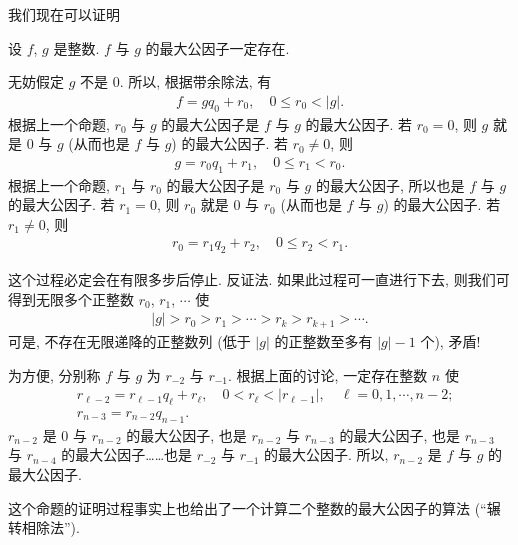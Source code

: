 我们现在可以证明
\begin{proposition}
    设 $f$, $g$ 是整数. $f$ 与 $g$ 的最大公因子一定存在.
\end{proposition}

\begin{pf}
    无妨假定 $g$ 不是 $0$. 所以, 根据带余除法, 有
    \begin{align*}
        f = gq_0 + r_0, \quad 0 \leq r_0 < |g|.
    \end{align*}
    根据上一个命题, $r_0$ 与 $g$ 的最大公因子是 $f$ 与 $g$ 的最大公因子. 若 $r_0 = 0$, 则 $g$ 就是 $0$ 与 $g$ (从而也是 $f$ 与 $g$) 的最大公因子. 若 $r_0 \neq 0$, 则
    \begin{align*}
        g = r_0 q_1 + r_1, \quad 0 \leq r_1 < r_0.
    \end{align*}
    根据上一个命题, $r_1$ 与 $r_0$ 的最大公因子是 $r_0$ 与 $g$ 的最大公因子, 所以也是 $f$ 与 $g$ 的最大公因子. 若 $r_1 = 0$, 则 $r_0$ 就是 $0$ 与 $r_0$ (从而也是 $f$ 与 $g$) 的最大公因子. 若 $r_1 \neq 0$, 则
    \begin{align*}
        r_0 = r_1 q_2 + r_2, \quad 0 \leq r_2 < r_1.
    \end{align*}

    这个过程必定会在有限多步后停止. 反证法. 如果此过程可一直进行下去, 则我们可得到无限多个正整数 $r_0$, $r_1$, $\cdots$ 使
    \begin{align*}
        |g| > r_0 > r_1 > \cdots > r_k > r_{k+1} > \cdots.
    \end{align*}
    可是, 不存在无限递降的正整数列 (低于 $|g|$ 的正整数至多有 $|g| - 1$ 个), 矛盾!

    为方便, 分别称 $f$ 与 $g$ 为 $r_{-2}$ 与 $r_{-1}$. 根据上面的讨论, 一定存在整数 $n$ 使
    \begin{align*}
         & r_{\ell - 2} = r_{\ell - 1} q_{\ell} + r_{\ell}, \quad 0 < r_{\ell} < |r_{\ell - 1}|, \quad \ell = 0,1,\cdots,n-2; \\
         & r_{n - 3} = r_{n - 2} q_{n - 1}.
    \end{align*}
    $r_{n-2}$ 是 $0$ 与 $r_{n-2}$ 的最大公因子, 也是 $r_{n-2}$ 与 $r_{n-3}$ 的最大公因子, 也是 $r_{n-3}$ 与 $r_{n-4}$ 的最大公因子……也是 $r_{-2}$ 与 $r_{-1}$ 的最大公因子. 所以, $r_{n-2}$ 是 $f$ 与 $g$ 的最大公因子.
\end{pf}

这个命题的证明过程事实上也给出了一个计算二个整数的最大公因子的算法 (``辗转相除法'').

